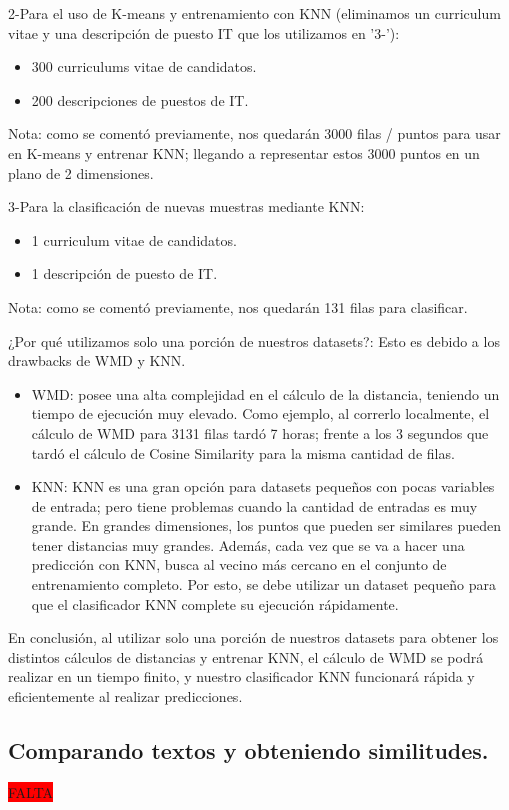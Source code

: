 \documentclass[12pt,a4paper]{article}
\begin{document}
\begin{sloppypar}
2-Para el uso de K-means y entrenamiento con KNN (eliminamos un curriculum vitae y una descripción de puesto IT que los utilizamos en '3-'):
\begin{itemize}
\item 300 curriculums vitae de candidatos.
\item 200 descripciones de puestos de IT.
\end{itemize}        
Nota: como se comentó previamente, nos quedarán 3000 filas / puntos para usar en K-means y entrenar KNN; llegando a representar estos 3000 puntos en un plano de 2 dimensiones.

3-Para la clasificación de nuevas muestras mediante KNN:
\begin{itemize}
\item 1 curriculum vitae de candidatos.
\item 1 descripción de puesto de IT.
\end{itemize}
Nota: como se comentó previamente, nos quedarán 131 filas para clasificar.

¿Por qué utilizamos solo una porción de nuestros datasets?: Esto es debido a los drawbacks de WMD y KNN.
\begin{itemize}
\item WMD: posee una alta complejidad en el cálculo de la distancia, teniendo un tiempo de ejecución muy elevado. Como ejemplo, al correrlo localmente, el cálculo de WMD para 3131 filas tardó 7 horas; frente a los 3 segundos que tardó el cálculo de Cosine Similarity para la misma cantidad de filas.
\item KNN: KNN es una gran opción para datasets pequeños con pocas variables de entrada; pero tiene problemas cuando la cantidad de entradas es muy grande. En grandes dimensiones, los puntos que pueden ser similares pueden tener distancias muy grandes. Además, cada vez que se va a hacer una predicción con KNN, busca al vecino más cercano en el conjunto de entrenamiento completo. Por esto, se debe utilizar un dataset pequeño para que el clasificador KNN complete su ejecución rápidamente.
\end{itemize}
En conclusión, al utilizar solo una porción de nuestros datasets para obtener los distintos cálculos de distancias y entrenar KNN, el cálculo de WMD se podrá realizar en un tiempo finito, y nuestro clasificador KNN funcionará rápida y eficientemente al realizar predicciones.

\cleardoublepage

\subsection{Comparando textos y obteniendo similitudes.}
\colorbox{red}{FALTA}


\end{sloppypar}
\end{document}
